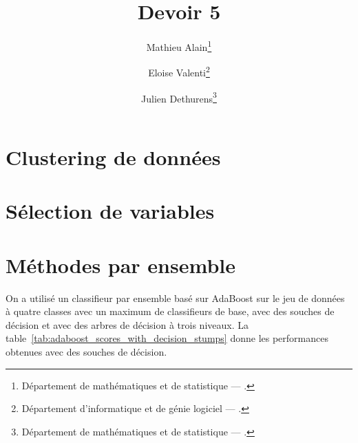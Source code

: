 \documentclass[french, twoside=semi, headings=normal]{scrartcl}
\title{Devoir 5}
\author{Mathieu Alain\thanks{Département de mathématiques et de statistique --- \mailmathieu.} \and Eloise Valenti\thanks{Département d'informatique et de génie logiciel --- \mailelo.} \and Julien Dethurens\thanks{Département de mathématiques et de statistique --- \mailjulien.}}
\begin{document}
\maketitle

\section{Clustering de données}

\section{Sélection de variables}

\section{Méthodes par ensemble}

On a utilisé un classifieur par ensemble basé sur AdaBoost sur le jeu de données à quatre classes avec un maximum de  classifieurs de base, avec des souches de décision et avec des arbres de décision à trois niveaux. La table~\ref{tab:adaboost_scores_with_decision_stumps} donne les performances obtenues avec des souches de décision.
\end{document}
